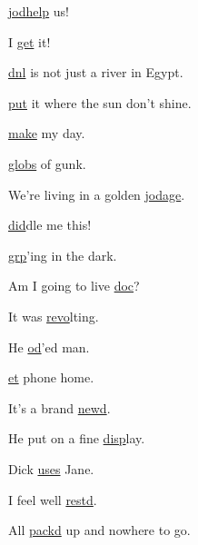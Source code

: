 \begin{center}

	\hyperlink{il:jodhelp}{jodhelp} us!
	
	I \hyperlink{il:get}{get} it!

   \hyperlink{il:dnl}{dnl} is not just a river in Egypt.
	
	\hyperlink{il:put}{put} it where the sun don't shine.
	
	\hyperlink{il:make}{make} my day.

   \hyperlink{il:globs}{globs} of gunk.
	
	We're living in a golden \hyperlink{il:jodage}{jodage}.
	
	\hyperlink{il:did}{did}dle me this!
	
	\hyperlink{il:grp}{grp}'ing in the dark.
	
	Am I going to live \hyperlink{il:doc}{doc}?
	
	It was \hyperlink{il:revo}{revo}lting.
	
	He \hyperlink{il:od}{od}'ed man.
	
	\hyperlink{il:et}{et} phone home.
	
	It's a brand \hyperlink{il:newd}{newd}.
	
	He put on a fine \hyperlink{il:disp}{disp}lay.
	
	Dick \hyperlink{il:uses}{uses} Jane.
	
	I feel well \hyperlink{il:restd}{restd}.
	
	All \hyperlink{il:packd}{packd} up and nowhere to go.
\end{center}

\normalsize	
\normalfont	

%

%

	
